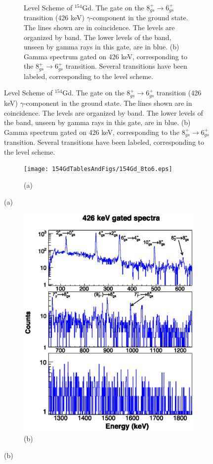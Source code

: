 \begin{figure}[!]
    \centering
    \label{fig:154_8to6}
    \begin{subfigure}{\textwidth}
    \caption{\centering \fontsize{10pt}{12pt}Level Scheme of $^{154}$Gd. The gate on the $8_{gs}^+\rightarrow 6_{gs}^+$ transition (426 keV) $\gamma$-component in the ground state. The lines shown are in coincidence. The levels are organized by band. The lower levels of the band, unseen by gamma rays in this gate, are in blue. (b) Gamma spectrum gated on 426 keV, corresponding to the $8_{gs}^+\rightarrow 6_{gs}^+$ transition. Several transitions have been labeled, corresponding to the level scheme.}
    \end{subfigure}
\end{figure}
\clearpage
\begin{figure}
    \ContinuedFloat
    \begin{subfigure}{\textwidth}
    \texttt{[image: 154GdTablesAndFigs/154Gd\_8to6.eps]}
    \caption*{(a)}
    \end{subfigure}
    \end{figure}
    \begin{figure}
    \ContinuedFloat
    \begin{subfigure}{\textwidth}
    \includegraphics[scale=1.3]{154GdTablesAndFigs/426_gamma.eps}
    \caption*{(b)}
    \label{fig:154_8to6spec}
    \end{subfigure}
\end{figure}